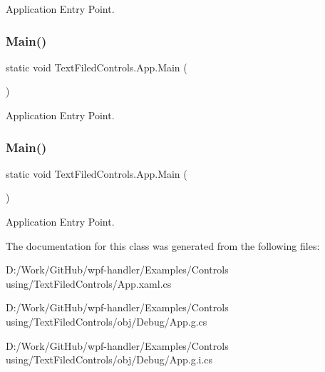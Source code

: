 Application Entry Point. 

\mbox{\label{class_text_filed_controls_1_1_app_a670664408b17fc92f178a2e548bd9c26}} 
\subsubsection{\texorpdfstring{Main()}{Main()}\hspace{0.1cm}{\footnotesize\ttfamily [3/4]}}
{\footnotesize\ttfamily static void Text\+Filed\+Controls.\+App.\+Main (\begin{DoxyParamCaption}{ }\end{DoxyParamCaption})\hspace{0.3cm}{\ttfamily [static]}}



Application Entry Point. 

\mbox{\label{class_text_filed_controls_1_1_app_a670664408b17fc92f178a2e548bd9c26}} 
\subsubsection{\texorpdfstring{Main()}{Main()}\hspace{0.1cm}{\footnotesize\ttfamily [4/4]}}
{\footnotesize\ttfamily static void Text\+Filed\+Controls.\+App.\+Main (\begin{DoxyParamCaption}{ }\end{DoxyParamCaption})\hspace{0.3cm}{\ttfamily [static]}}



Application Entry Point. 



The documentation for this class was generated from the following files\+:\begin{DoxyCompactItemize}
\item 
D\+:/\+Work/\+Git\+Hub/wpf-\/handler/\+Examples/\+Controls using/\+Text\+Filed\+Controls/App.\+xaml.\+cs\item 
D\+:/\+Work/\+Git\+Hub/wpf-\/handler/\+Examples/\+Controls using/\+Text\+Filed\+Controls/obj/\+Debug/App.\+g.\+cs\item 
D\+:/\+Work/\+Git\+Hub/wpf-\/handler/\+Examples/\+Controls using/\+Text\+Filed\+Controls/obj/\+Debug/App.\+g.\+i.\+cs\end{DoxyCompactItemize}
